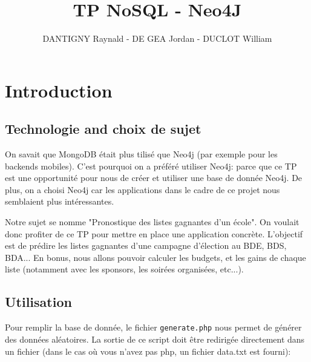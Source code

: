 \documentclass[a4paper,oneside,1pt]{article}
\title{TP NoSQL - Neo4J}
\author{DANTIGNY Raynald - DE GEA Jordan - DUCLOT William}
\begin{document}





\maketitle

\section{Introduction}

\subsection{Technologie and choix de sujet}
On savait que MongoDB était plus tilisé que Neo4j (par exemple pour les backends mobiles). C'est pourquoi on a préféré utiliser Neo4j: parce que ce TP est une opportunité pour nous de créer et utiliser une base de donnée Neo4j. De plus, on a choisi Neo4j car les applications dans le cadre de ce projet nous semblaient plus intéressantes.
\linebreak

Notre sujet se nomme "Pronostique des listes gagnantes d'un école". On voulait donc profiter de ce TP pour mettre en place une application concrète. L'objectif est de prédire les listes gagnantes d'une campagne d'élection au BDE, BDS, BDA... En bonus, nous allons pouvoir calculer les budgets, et les gains de chaque liste (notamment avec les sponsors, les soirées organisées, etc...). 

\subsection{Utilisation}


Pour remplir la base de donnée, le fichier \texttt{generate.php} nous permet de générer des données aléatoires. La sortie de ce script doit être redirigée directement dans un fichier (dans le cas où vous n'avez pas php, un fichier data.txt est fourni):
\end{document}
